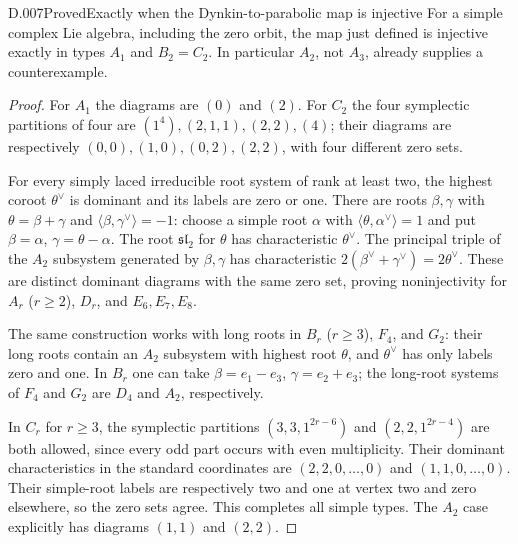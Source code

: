 \begin{saresult}{D.007}{Proved}{Exactly when the Dynkin-to-parabolic map is injective}
For a simple complex Lie algebra, including the zero orbit, the map
just defined is injective exactly in types $A_1$ and $B_2=C_2$.
In particular $A_2$, not $A_3$, already supplies a counterexample.
\end{saresult}
\begin{proof}
For $A_1$ the diagrams are $(0)$ and $(2)$.
For $C_2$ the four symplectic partitions of four are
$(1^4),(2,1,1),(2,2),(4)$; their diagrams are respectively
$(0,0),(1,0),(0,2),(2,2)$, with four different zero sets.

For every simply laced irreducible root system of rank at least two,
the highest coroot $\theta^\vee$ is dominant and its labels are zero
or one.  There are roots $\beta,\gamma$ with
$\theta=\beta+\gamma$ and $\langle\beta,\gamma^\vee\rangle=-1$:
choose a simple root $\alpha$ with
$\langle\theta,\alpha^\vee\rangle=1$ and put
$\beta=\alpha$, $\gamma=\theta-\alpha$.
The root $\mathfrak{sl}_2$ for $\theta$ has characteristic
$\theta^\vee$.  The principal triple of the $A_2$ subsystem generated
by $\beta,\gamma$ has characteristic $2(\beta^\vee+\gamma^\vee)
=2\theta^\vee$.  These are distinct dominant diagrams with the same
zero set, proving noninjectivity for $A_r$ ($r\ge2$), $D_r$, and
$E_6,E_7,E_8$.

The same construction works with long roots in $B_r$ ($r\ge3$),
$F_4$, and $G_2$: their long roots contain an $A_2$ subsystem with
highest root $\theta$, and $\theta^\vee$ has only labels zero and
one.  In $B_r$ one can take
$\beta=e_1-e_3$, $\gamma=e_2+e_3$; the long-root systems of $F_4$
and $G_2$ are $D_4$ and $A_2$, respectively.

In $C_r$ for $r\ge3$, the symplectic partitions
$(3,3,1^{2r-6})$ and $(2,2,1^{2r-4})$ are both allowed, since every
odd part occurs with even multiplicity.  Their dominant
characteristics in the standard coordinates are
$(2,2,0,\ldots,0)$ and $(1,1,0,\ldots,0)$.
Their simple-root labels are respectively two and one at vertex two
and zero elsewhere, so the zero sets agree.  This completes all
simple types.  The $A_2$ case explicitly has diagrams $(1,1)$ and
$(2,2)$.
\end{proof}

